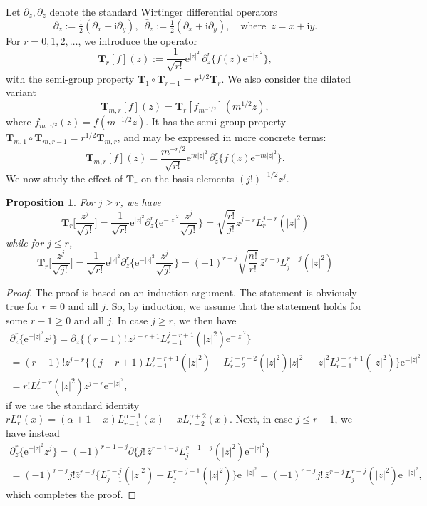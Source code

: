 \documentclass{birkart}
\newtheorem{prop}[thm]{Proposition}
\theoremstyle{definition}
\theoremstyle{remark}
\numberwithin{equation}{section}
\numberwithin{figure}{section}
\newcommand{\e}{\mathrm e}
\newcommand{\1}{{\mathbf 1}}
\newcommand{\Tope}{{\mathbf T}}
\newcommand{\imag}{{\mathrm i}}
\begin{document}
Let $\partial_z,\bar\partial_z$ denote the standard Wirtinger differential 
operators
\[
\partial_z:=\tfrac12(\partial_x-\imag\partial_y),\,\,\,
\bar\partial_z:=\tfrac12(\partial_x+\imag\partial_y),
\quad\text{where}\,\,\, z=x+\imag y.
\]
For $r=0,1,2,\ldots$, we introduce the operator 
\begin{equation*}
\Tope_{r}[f](z):=\frac{1}{\sqrt{r!}} \e^{|z|^2}\,
\partial_z^r\big\{f(z)\e^{-|z|^2}\big\}, 
\end{equation*}
with the semi-group property $\Tope_1\circ\Tope_{r-1}=r^{1/2}\Tope_r$.
We also consider the dilated variant
\begin{equation*}
\Tope_{m,r}[f](z) = \Tope_r[f_{m^{-1/2}}](m^{1/2}z), 
\end{equation*}
where $f_{m^{-1/2}}(z)=f(m^{-1/2}z)$. It has the semi-group property 
$\Tope_{m,1}\circ\Tope_{m,r-1}=r^{1/2}\Tope_{m,r}$, and may be expressed
in more concrete terms:
\begin{equation*}
\Tope_{m,r}[f](z) = \frac{m^{-r/2}}{\sqrt{r!}} \e^{m|z|^2}\,
\partial_z^r\big\{f(z)\e^{-m|z|^2}\big\}.
\end{equation*}  
We now study the effect of $\Tope_r$ on the basis elements $(j!)^{-1/2}z^j$.

\begin{prop} 
\label{T_r-prop}
For $j\ge r$, we have
\[
\Tope_r\bigg[\frac{z^j}{\sqrt{j!}}\bigg]=
\frac{1}{\sqrt{r!}}\e^{|z|^2}
\partial^r_z\bigg\{\e^{-|z|^2}\frac{z^j}{\sqrt{j!}}\bigg\}= 
\sqrt{\frac{r!}{j!}}z^{j-r}L^{j-r}_r(|z|^2)
\]
while for $j \leq r$, 
\[
\Tope_r\bigg[\frac{z^j}{\sqrt{j!}}\bigg]=
\frac{1}{\sqrt{r!}}\e^{|z|^2}\partial^r_z\bigg\{\e^{-|z|^2}
\frac{z^j}{\sqrt{j!}}\bigg\}= 
(-1)^{r-j}\sqrt{\frac{n!}{r!}}\,\bar{z}^{r-j}L^{r-j}_j(|z|^2)
\]
\end{prop}

\begin{proof}
The proof is based on an induction argument. 
The statement is obviously true for $r=0$ and all $j$. 
So, by induction, we assume that the statement holds for some 
$r-1\geq 0$ and all $j$. In case $j\ge r$, we then have
\begin{multline*}
\partial^r_z\{\e^{-|z|^2}z^j\}= 
\partial_z\big\{(r-1)!\,z^{j-r+1}L^{j-r+1}_{r-1}(|z|^2)\e^{-|z|^2} 
\big\}
\\
=(r-1)! z^{j-r}
\big\{(j-r+1)L^{j-r+1}_{r-1}(|z|^2)-L^{j-r+2}_{r-2}(|z|^2)|z|^2  
-|z|^2L^{j-r+1}_{r-1}(|z|^2)\big\}\e^{-|z|^2} 
\\
= r! L^{j-r}_r(|z|^2)z^{j-r}\e^{-|z|^2},
\end{multline*}
if we use the standard identity $rL^{\alpha}_r(x) = (\alpha + 1 -x) 
L^{\alpha+1}_{r-1}(x) - xL^{\alpha+2}_{r-2}(x)$.
Next, in case $j\leq r-1$, we have instead
\begin{multline*}
\partial^r_z\{\e^{-|z|^2}z^j\}= (-1)^{r-1-j} \partial 
\big\{
j!\,\bar{z}^{r-1-j}L^{r-1-j}_j(|z|^2)\e^{-|z|^2} 
\big\} 
\\
=(-1)^{r-j} j! \bar{z}^{r-j} \big\{L^{r-j}_{j-1}(|z|^2)+ 
L^{r-j-1}_{j}(|z|^2) \big\}\e^{-|z|^2}
=(-1)^{r-j} j!\,\bar{z}^{r-j}L^{r-j}_j (|z|^2)\e^{-|z|^2},
\end{multline*}
which completes the proof.
\end{proof}
\medskip
\end{document}
